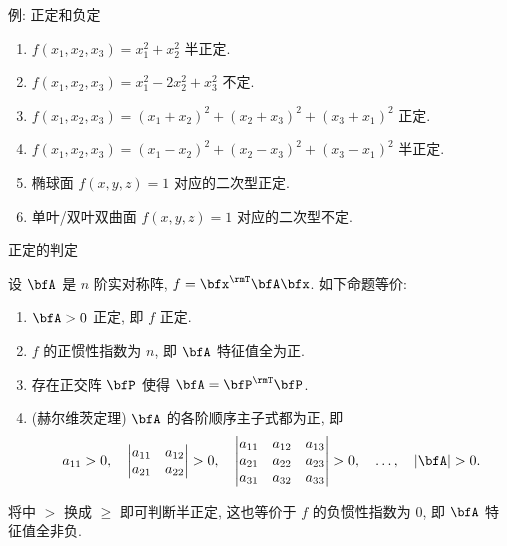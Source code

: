 \begin{frame}{例: 正定和负定}
	\onslide<+->
	\begin{example}
		\begin{enumerate}
			\item $f(x_1,x_2,x_3)=x_1^2+x_2^2$ 半正定.
			\item $f(x_1,x_2,x_3)=x_1^2-2x_2^2+x_3^2$ 不定.
			\item $f(x_1,x_2,x_3)=(x_1+x_2)^2+(x_2+x_3)^2+(x_3+x_1)^2$ 正定.
			\item $f(x_1,x_2,x_3)=(x_1-x_2)^2+(x_2-x_3)^2+(x_3-x_1)^2$ 半正定.
			\item 椭球面 $f(x,y,z)=1$ 对应的二次型正定.
			\item 单叶/双叶双曲面 $f(x,y,z)=1$ 对应的二次型不定.
		\end{enumerate}
	\end{example}
\end{frame}


\begin{frame}{正定的判定}
	\onslide<+->
	\begin{theorem}
		设 $\bfA$ 是 $n$ 阶实对称阵, $f=\bfx^\rmT\bfA\bfx$. 如下命题等价:
		\begin{enumerate}
			\item $\bfA>0$ 正定, 即 $f$ 正定.
			\item $f$ 的正惯性指数为 $n$, 即 $\bfA$ 特征值全为正.
			\item 存在正交阵 $\bfP$ 使得 $\bfA=\bfP^\rmT\bfP$.
			\item (赫尔维茨定理) $\bfA$ 的各阶顺序主子式都为正, 即
			\[a_{11}>0,\quad
			\begin{vmatrix}
				a_{11}&a_{12}\\
				a_{21}&a_{22}
			\end{vmatrix}>0,\quad
			\begin{vmatrix}
				a_{11}&a_{12}&a_{13}\\
				a_{21}&a_{22}&a_{23}\\
				a_{31}&a_{32}&a_{33}
			\end{vmatrix}>0,\quad
			\dots,\quad
			|\bfA|>0.\]\label{enum:hurwitz}
		\end{enumerate}
		\vspace{-\baselineskip}
	\end{theorem}
	\onslide<+->
	将中 $>$ 换成 $\ge$ 即可判断半正定, 这也等价于 $f$ 的负惯性指数为 $0$, 即 $\bfA$ 特征值全非负.
\end{frame}


